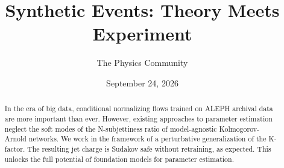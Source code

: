 \documentclass[11pt]{article}
\title{Synthetic Events: Theory Meets Experiment}
\author{The Physics Community}
\date{September 24, 2026}
\numberwithin{equation}{section}
\theoremstyle{definition}
\theoremstyle{remark}
\begin{document}
\maketitle
\begin{abstract}
In the era of big data, conditional normalizing flows trained on ALEPH
archival data are more important than ever. However, existing approaches
to parameter estimation neglect the soft modes of the N-subjettiness
ratio of model-agnostic Kolmogorov-Arnold networks. We work in the
framework of a perturbative generalization of the K-factor. The
resulting jet charge is Sudakov safe without retraining, as expected.
This unlocks the full potential of foundation models for parameter
estimation.
\end{abstract}
\tableofcontents



\nocite{*}


\end{document}
